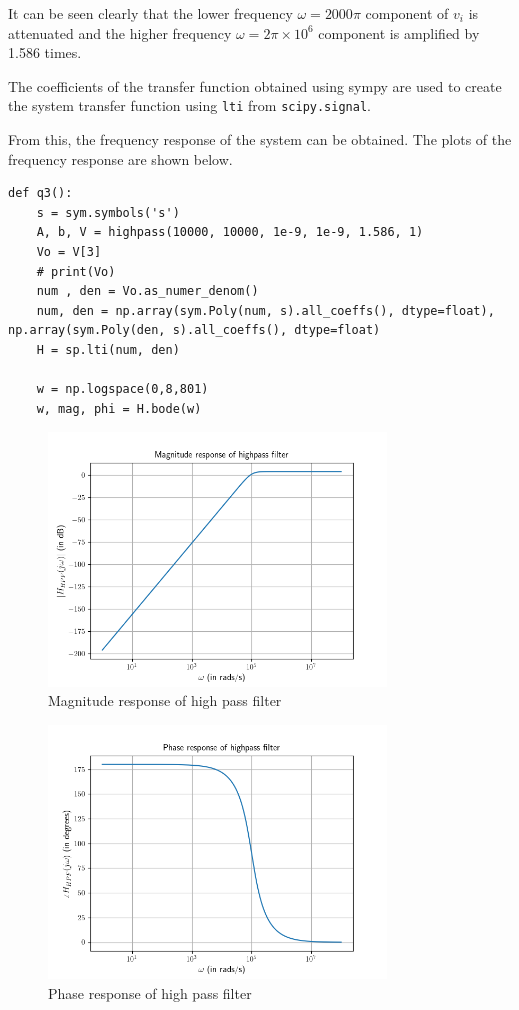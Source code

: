 \documentclass[12pt, a4paper]{article}
\begin{document}
It can be seen clearly that the lower frequency $\omega = 2000\pi$ component of $v_i$ is attenuated and the higher frequency $\omega = 2\pi \times 10^6$ component is amplified by 1.586 times.

The coefficients of the transfer function obtained using sympy are used to create the system transfer function using \texttt{lti} from \texttt{scipy.signal}.

From this, the frequency response of the system can be obtained. The plots of the frequency response are shown below.

\begin{lstlisting}
def q3():
    s = sym.symbols('s')
    A, b, V = highpass(10000, 10000, 1e-9, 1e-9, 1.586, 1)
    Vo = V[3]
    # print(Vo)
    num , den = Vo.as_numer_denom()
    num, den = np.array(sym.Poly(num, s).all_coeffs(), dtype=float), np.array(sym.Poly(den, s).all_coeffs(), dtype=float)
    H = sp.lti(num, den)

    w = np.logspace(0,8,801)
    w, mag, phi = H.bode(w)
\end{lstlisting}

\begin{figure}[H]
\centering
\includegraphics[width=0.8\textwidth]{q3MagHPF.png}
\caption{Magnitude response of high pass filter}
\end{figure}

\begin{figure}[H]
\centering
\includegraphics[width=0.8\textwidth]{q3PhaseHPF.png}
\caption{Phase response of high pass filter}
\end{figure}
\end{document}
